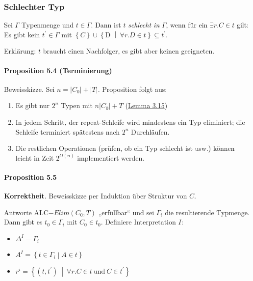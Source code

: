 \subsubsection{Schlechter Typ}\label{schlechter-typ}

Sei $\Gamma$ Typenmenge und $t \in \Gamma$. Dann ist $t$
\emph{schlecht in} $\Gamma$, wenn für ein $\exists r.C \in t$ gilt:
Es gibt kein $t^{'} \in \Gamma$ mit
$\left\{ C \right\} \cup \left\{ \text{D\ } \middle| \ \forall r.D \in t \right\} \subseteq t^{'}$.

Erklärung: $t$ braucht einen Nachfolger, es gibt aber keinen
geeigneten.

\paragraph{Proposition 5.4
(Terminierung)}\label{proposition-5.4-terminierung}

Beweisskizze. Sei $n = \left| C_{0} \right| + |T|$. Proposition folgt
aus:

\begin{enumerate}
\def\labelenumi{\arabic{enumi}.}
\item
  Es gibt nur $2^{n}$ Typen mit $n \left| C_{0} \right| + T$
  (\protect\hyperlink{lemma-3.15}{Lemma 3.15})
\item
  In jedem Schritt, der repeat-Schleife wird mindestens ein Typ
  eliminiert; die Schleife terminiert spätestens nach $2^{n}$
  Durchläufen.
\item
  Die restlichen Operationen (prüfen, ob ein Typ schlecht ist usw.)
  können leicht in Zeit $2^{O\left( n \right)}$ implementiert werden.
\end{enumerate}

\paragraph{Proposition 5.5}\label{proposition-5.5}

\textbf{Korrektheit}. Beweisskizze per Induktion über Struktur von
$C$.

Antworte $\text{ALC}\mathrm{-}Elim(C_{0},T)$ „erfüllbar`` und sei
$\Gamma_{i}$ die resultierende Typmenge. Dann gibt es
$t_{0} \in \Gamma_{i}$ mit $C_{0} \in t_{0}$. Definiere
Interpretation $I$:

\begin{itemize}
\item
  $\Delta^{I} = \Gamma_{i}$
\item
  $A^{I} = \left\{ t \in \Gamma_{i} \middle| A \in t \right\}$
\item
  $r^{i} = \left\{ \left( t,t^{'} \right)\  \middle| \ \forall r.C \in t\ \mathrm{\text{und}}\ C \in t^{'} \right\}$
\end{itemize}

